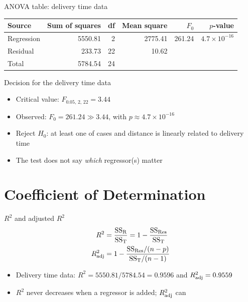 \begin{frame}{ANOVA table: delivery time data}
    \begin{center}
        \begin{tabular}{lrrrrr}
            \toprule
            Source & Sum of squares & df & Mean square & $F_0$ & $p$-value \\
            \midrule
            Regression & 5550.81 & 2 & 2775.41 & 261.24 & $4.7\times 10^{-16}$ \\
            Residual & 233.73 & 22 & 10.62 & & \\
            Total & 5784.54 & 24 & & & \\
            \bottomrule
        \end{tabular}
    \end{center}
\end{frame}


\begin{frame}{Decision for the delivery time data}
    \begin{itemize}
        \item Critical value: $F_{0.05,\,2,\,22} = 3.44$
        \item Observed: $F_0 = 261.24 \gg 3.44$, with $p \approx 4.7\times 10^{-16}$
        \item Reject $H_0$: at least one of cases and distance is linearly related to delivery time
        \item The test does not say \emph{which} regressor(s) matter
    \end{itemize}
\end{frame}



\section{Coefficient of Determination}


\begin{frame}{$R^2$ and adjusted $R^2$}
    \begin{align*}
        R^2 &= \frac{\mathrm{SS}_{\mathrm{R}}}{\mathrm{SS}_{\mathrm{T}}} = 1 - \frac{\mathrm{SS}_{\mathrm{Res}}}{\mathrm{SS}_{\mathrm{T}}} \\
        R^2_{\mathrm{adj}} &= 1 - \frac{\mathrm{SS}_{\mathrm{Res}}/(n-p)}{\mathrm{SS}_{\mathrm{T}}/(n-1)}
    \end{align*}
    \begin{itemize}
        \item Delivery time data: $R^2 = 5550.81/5784.54 = 0.9596$ and $R^2_{\mathrm{adj}} = 0.9559$
        \item $R^2$ never decreases when a regressor is added; $R^2_{\mathrm{adj}}$ can
    \end{itemize}
\end{frame}


